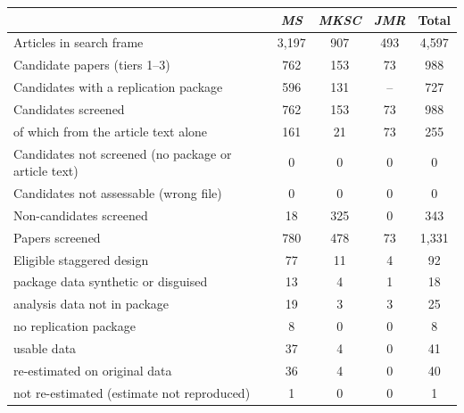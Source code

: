 \begin{tabular}{lcccc}
\toprule
 & \emph{MS} & \emph{MKSC} & \emph{JMR} & Total \\
\midrule
Articles in search frame & 3,197 & 907 & 493 & 4,597 \\
Candidate papers (tiers 1--3) & 762 & 153 & 73 & 988 \\
Candidates with a replication package & 596 & 131 & -- & 727 \\
Candidates screened & 762 & 153 & 73 & 988 \\
\quad of which from the article text alone & 161 & 21 & 73 & 255 \\
Candidates not screened (no package or article text) & 0 & 0 & 0 & 0 \\
Candidates not assessable (wrong file) & 0 & 0 & 0 & 0 \\
Non-candidates screened & 18 & 325 & 0 & 343 \\
Papers screened & 780 & 478 & 73 & 1,331 \\
\midrule
Eligible staggered design & 77 & 11 & 4 & 92 \\
\quad package data synthetic or disguised & 13 & 4 & 1 & 18 \\
\quad analysis data not in package & 19 & 3 & 3 & 25 \\
\quad no replication package & 8 & 0 & 0 & 8 \\
\quad usable data & 37 & 4 & 0 & 41 \\
\qquad re-estimated on original data & 36 & 4 & 0 & 40 \\
\qquad not re-estimated (estimate not reproduced) & 1 & 0 & 0 & 1 \\
\bottomrule
\end{tabular}
